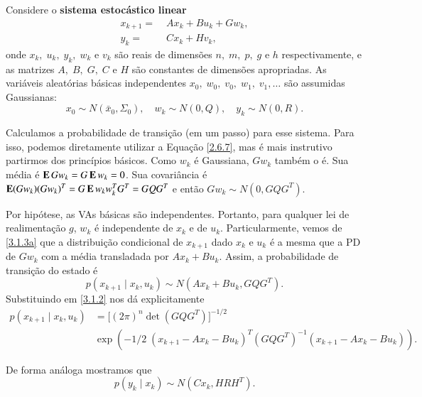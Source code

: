 Considere o {\bf sistema estocástico linear}
\begin{subequations}\label{3.1.3}
	\begin{align}
	 x_{k+1}= &\; Ax_k+Bu_k+Gw_k,
	 \label{3.1.3a}\\
	y_k =&\; Cx_k + Hv_k,
	\label{3.1.3b}
	\end{align}
\end{subequations}
onde $x_k,\;u_k,\;y_k,\;w_k$ e $v_k$ são reais de dimensões $n,\;m,\;p,\;g$ e $h$ respectivamente, e as matrizes $A,\;B,\;G,\;C$
e $H$ são constantes de dimensões apropriadas.
As variáveis aleatórias básicas independentes $x_0,\; w_0,\; v_0,\; w_1,\;v_1,\dots$ são assumidas Gaussianas:
\begin{equation}\label{3.1.4}
	x_0\sim N(\bar x_0,\Sigma_0),
	\quad w_k\sim N(0,Q),
	\quad y_k\sim N(0,R).
\end{equation}

Calculamos a probabilidade de transição (em um passo) para esse sistema. Para isso, podemos diretamente utilizar a Equação \eqref{2.6.7}, mas é mais instrutivo partirmos dos princípios básicos. Como $w_k$ é Gaussiana, $Gw_k$ também o é. Sua média é $\operatorname{\bf E} Gw_k=G\operatorname{\bf E} w_k=0$. Sua covariância é $\operatorname{\bf E} (Gw_k)(Gw_k)^T=G\operatorname{\bf E} w_kw_k^TG^T=GQG^T$ e então $Gw_k\sim N(0,GQG^T)$.

Por hipótese, as VAs básicas são independentes. Portanto, para qualquer lei de realimentação $g$, $w_k$ é independente de $x_k$ e de $u_k$. Particularmente, vemos de \eqref{3.1.3a} que a distribuição condicional de $x_{k+1}$ dado $x_k$ e $u_k$ é a mesma que a PD de $Gw_k$ com a média transladada por $Ax_k+Bu_k$. Assim, a probabilidade de transição do estado é
\begin{equation}\label{3.1.5}
	p(x_{k+1}\;|\;x_k,u_k) \sim
	N(Ax_k+Bu_k,GQG^T).
\end{equation}
Substituindo em \eqref{3.1.2} nos dá explicitamente
\[
\begin{split}
	p(x_{k+1}\;|\;x_k,u_k) &= \Big[(2\pi)^n
	\det(GQG^T)
	\Big]^{-1/2}\\&\exp\left(-1/2\;
	(x_{k+1}-Ax_k-Bu_k)^T  (GQG^T)^{-1}
	(x_{k+1}-Ax_k-Bu_k)
	\right).
\end{split}
\]

De forma análoga mostramos que
\begin{equation}\label{3.1.6}
	p(y_k\;|\; x_k) \sim N(Cx_k,HRH^T).
\end{equation}

